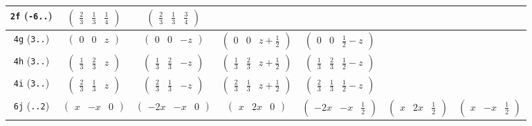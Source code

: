 \documentclass[fleqn,9pt,landscape]{jsarticle}
\begin{document}
\begin{center}
\begin{longtable}{ccccccc}
{\tt 2f} ({\tt -6..}) & $ \begin{pmatrix} \frac{2}{3} & \frac{1}{3} & \frac{1}{4} \end{pmatrix} $ & $ \begin{pmatrix} \frac{2}{3} & \frac{1}{3} & \frac{3}{4} \end{pmatrix} $ & $  $ & $  $ & $  $ & $  $ \\ \hline
{\tt 4g} ({\tt 3..}) & $ \begin{pmatrix} 0 & 0 & z \end{pmatrix} $ & $ \begin{pmatrix} 0 & 0 & - z \end{pmatrix} $ & $ \begin{pmatrix} 0 & 0 & z + \frac{1}{2} \end{pmatrix} $ & $ \begin{pmatrix} 0 & 0 & \frac{1}{2} - z \end{pmatrix} $ & $  $ & $  $ \\ \hline
{\tt 4h} ({\tt 3..}) & $ \begin{pmatrix} \frac{1}{3} & \frac{2}{3} & z \end{pmatrix} $ & $ \begin{pmatrix} \frac{1}{3} & \frac{2}{3} & - z \end{pmatrix} $ & $ \begin{pmatrix} \frac{1}{3} & \frac{2}{3} & z + \frac{1}{2} \end{pmatrix} $ & $ \begin{pmatrix} \frac{1}{3} & \frac{2}{3} & \frac{1}{2} - z \end{pmatrix} $ & $  $ & $  $ \\ \hline
{\tt 4i} ({\tt 3..}) & $ \begin{pmatrix} \frac{2}{3} & \frac{1}{3} & z \end{pmatrix} $ & $ \begin{pmatrix} \frac{2}{3} & \frac{1}{3} & - z \end{pmatrix} $ & $ \begin{pmatrix} \frac{2}{3} & \frac{1}{3} & z + \frac{1}{2} \end{pmatrix} $ & $ \begin{pmatrix} \frac{2}{3} & \frac{1}{3} & \frac{1}{2} - z \end{pmatrix} $ & $  $ & $  $ \\ \hline
{\tt 6j} ({\tt ..2}) & $ \begin{pmatrix} x & - x & 0 \end{pmatrix} $ & $ \begin{pmatrix} - 2 x & - x & 0 \end{pmatrix} $ & $ \begin{pmatrix} x & 2 x & 0 \end{pmatrix} $ & $ \begin{pmatrix} - 2 x & - x & \frac{1}{2} \end{pmatrix} $ & $ \begin{pmatrix} x & 2 x & \frac{1}{2} \end{pmatrix} $ & $ \begin{pmatrix} x & - x & \frac{1}{2} \end{pmatrix} $ \\ \hline

\end{longtable}
\end{center}
\end{document}
